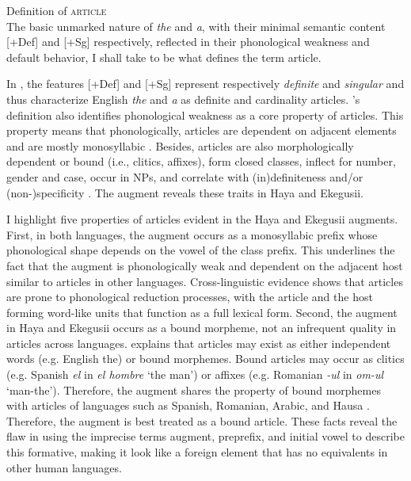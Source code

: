 \documentclass[output=paper]{langscibook}
\begin{document}
\begin{exe}
\ex Definition of \textsc{article}\label{31}\\
    The basic unmarked nature of \textit{the} and \textit{a}, with their minimal semantic content [+Def] and [+Sg] respectively, reflected in their phonological weakness and default behavior, I shall take to be what defines the term article.
\end{exe}
In , the features [+Def] and [+Sg] represent respectively \textit{definite} and \textit{singular} and thus characterize English \textit{the} and \textit{a} as definite and cardinality articles. \citeauthor{lyons1999definiteness}’s definition also identifies phonological weakness as a core property of articles. This property means that phonologically, articles are dependent on adjacent elements and are mostly monosyllabic \citep{giusti1997categorial}. Besides, articles are also morphologically dependent or bound (i.e., clitics, affixes), form closed classes, inflect for number, gender and case, occur in NPs, and correlate with (in)definiteness and/or (non-)specificity \citep{giusti1997categorial}. The augment reveals these traits in Haya and Ekegusii.

I highlight five properties of articles evident in the Haya and Ekegusii augments. First, in both languages, the augment occurs as a monosyllabic prefix whose phonological shape depends on the vowel of the class prefix. This underlines the fact that the augment is phonologically weak and dependent on the adjacent host similar to articles in other languages. Cross-linguistic evidence shows that articles are prone to phonological reduction processes, with the article and the host forming word-like units that function as a full lexical form. Second, the augment in Haya and Ekegusii occurs as a bound morpheme, not an infrequent quality in articles across languages. \citet[63]{lyons1999definiteness} explains that articles may exist as either independent words (e.g. English the) or bound morphemes. Bound articles may occur as clitics (e.g. Spanish \textit{el} in \textit{el hombre} ‘the man’) or affixes (e.g. Romanian \textit{-ul} in \textit{om-ul} ‘man-the’). Therefore, the augment shares the property of bound morphemes with articles of languages such as Spanish, Romanian, Arabic, and Hausa \citep{lyons1999definiteness}. Therefore, the augment is best treated as a bound article. These facts reveal the flaw in using the imprecise terms augment, preprefix, and initial vowel to describe this formative, making it look like a foreign element that has no equivalents in other human languages.
\end{document}
